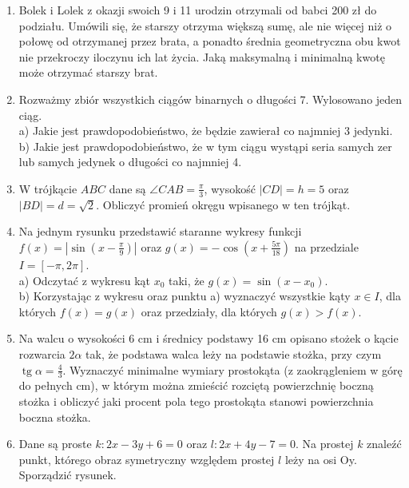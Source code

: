 \documentclass[10pt]{article}
\begin{document}
\begin{enumerate}
  \item Bolek i Lolek z okazji swoich 9 i 11 urodzin otrzymali od babci 200 zł do podziału. Umówili się, że starszy otrzyma większą sumę, ale nie więcej niż o połowę od otrzymanej przez brata, a ponadto średnia geometryczna obu kwot nie przekroczy iloczynu ich lat życia. Jaką maksymalną i minimalną kwotę może otrzymać starszy brat.
  \item Rozważmy zbiór wszystkich ciągów binarnych o długości 7. Wylosowano jeden ciąg.\\
a) Jakie jest prawdopodobieństwo, że będzie zawierał co najmniej 3 jedynki.\\
b) Jakie jest prawdopodobieństwo, że w tym ciągu wystąpi seria samych zer lub samych jedynek o długości co najmniej 4.
  \item W trójkącie $A B C$ dane są $\angle C A B=\frac{\pi}{3}$, wysokość $|C D|=h=5$ oraz $|B D|=d=\sqrt{2}$. Obliczyć promień okręgu wpisanego w ten trójkąt.
  \item Na jednym rysunku przedstawić staranne wykresy funkcji $f(x)=\left|\sin \left(x-\frac{\pi}{9}\right)\right|$ oraz $g(x)=-\cos \left(x+\frac{5 \pi}{18}\right)$ na przedziale $I=[-\pi, 2 \pi]$.\\
a) Odczytać z wykresu kąt $x_{0}$ taki, że $g(x)=\sin \left(x-x_{0}\right)$.\\
b) Korzystając z wykresu oraz punktu a) wyznaczyć wszystkie kąty $x \in I$, dla których $f(x)=g(x)$ oraz przedziały, dla których $g(x)>f(x)$.
  \item Na walcu o wysokości 6 cm i średnicy podstawy 16 cm opisano stożek o kącie rozwarcia $2 \alpha$ tak, że podstawa walca leży na podstawie stożka, przy czym $\operatorname{tg} \alpha=\frac{4}{3}$. Wyznaczyć minimalne wymiary prostokąta (z zaokrągleniem w górę do pełnych cm), w którym można zmieścić rozciętą powierzchnię boczną stożka i obliczyć jaki procent pola tego prostokąta stanowi powierzchnia boczna stożka.
  \item Dane są proste $k: 2 x-3 y+6=0$ oraz $l: 2 x+4 y-7=0$. Na prostej $k$ znaleźć punkt, którego obraz symetryczny względem prostej $l$ leży na osi Oy. Sporządzić rysunek.
\end{enumerate}
\end{document}
